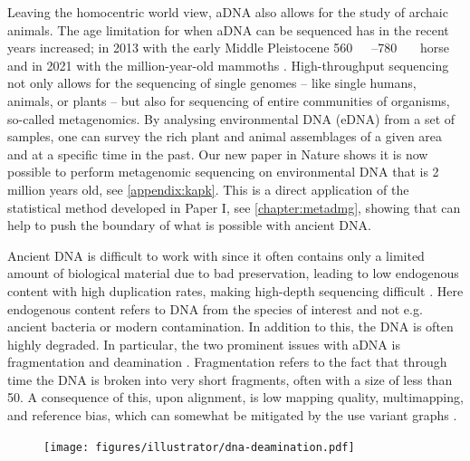 Leaving the homocentric world view, aDNA also allows for the study of archaic animals. The age limitation for when aDNA can be sequenced has in the recent years increased; in 2013 with the early Middle Pleistocene \qtyrange[range-phrase = --,range-units = single]{560}{780}{\kilo\year\BP} horse \autocite{orlandoRecalibratingEquusEvolution2013} and in 2021 with the million-year-old mammoths \autocite{vandervalkMillionyearoldDNASheds2021}. High-throughput sequencing not only allows for the sequencing of single genomes -- like single humans, animals, or plants -- but also for sequencing of entire communities of organisms, so-called metagenomics. By analysing environmental DNA (eDNA) from a set of samples, one can survey the rich plant and animal assemblages of a given area and at a specific time in the past. Our new paper in Nature shows it is now possible to perform metagenomic sequencing on environmental DNA that is 2 million years old, see \autoref{appendix:kapk}. This is a direct application of the statistical method developed in Paper I, see \autoref{chapter:metadmg}, showing that \metaDMG can help to push the boundary of what is possible with ancient DNA.

Ancient DNA is difficult to work with since it often contains only a limited amount of biological material due to bad preservation, leading to low endogenous content with high duplication rates, making high-depth sequencing difficult \autocite{renaudAuthenticationAssessmentContamination2019}. Here endogenous content refers to DNA from the species of interest and not e.g. ancient bacteria or modern contamination.
In addition to this, the DNA is often highly degraded. In particular, the two prominent issues with aDNA is fragmentation and deamination \autocite{dabneyAncientDNADamage2013,peyregnePresentDayDNAContamination2020,}. Fragmentation refers to the fact that through time the DNA is broken into very short fragments, often with a size of less than \SI{50}{\basepairs}.
A consequence of this, upon alignment, is low mapping quality, multimapping, and reference bias, which can somewhat be mitigated by the use variant graphs \autocite{martinianoRemovingReferenceBias2020}.

\begin{figure}[htbp]
    \centering
    \texttt{[image: figures/illustrator/dna-deamination.pdf]}
\end{figure}

